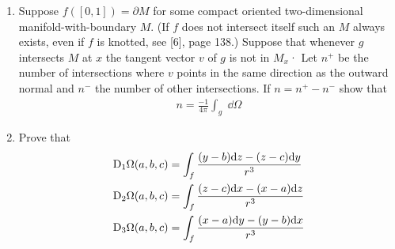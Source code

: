 \begin{problems}
{\begin{enumerate}[label=(\alph*)]
                If $M$ is a compact two-dimensional manifold-with-boundary in $\F{R}^3$ and $(a,b,c)\notin M$ 
                define
                \begin{align*}
                    \Omega(a,b,c)=\int_{M}\;\dd\Theta_{(a,b,c)}.
                \end{align*}

                Let $(a',b',c')$ be a point on the same side of $M$ as the outward normal and $(a',b'c')$
                a point on the oppsite side. Show that by choosing $(a,b,c)$ sufficently close to $(a'.b',c')$ we can 
                make $\Omega(a,b,c)-\Omega(a',b',c')$ as close to $-4\pi$ as desired. \textit{Hint:} First 
                show that if $M=\partial N$ then $\Omega(a,b,c)=-4\pi$ for $(a,b,c)\in N-M$ and $\Omega(a,b,c)=0$
                for $(a,b,c)\notin N$.
            \item Suppose $f([0,1]) = \partial M$ for some compact oriented two-dimensional 
                manifold-with-boundary $M$. (If $f$ does not intersect itself such an $M$ always 
                exists, even if $f$ is knotted, see [6], page 138.) Suppose that whenever $g$ 
                intersects $M$ at $x$ the tangent vector $v$ of $g$ is not in $M_x$·
                Let $n^+$ be the number of intersections where $v$ points in the same direction as 
                the outward normal and $n^-$ the number of other intersections. If $n=n^+ - n^-$ show that
                \begin{align*}
                    n=\frac{-1}{4\pi}\int_{g}\;\dd\Omega
                \end{align*}
            \item Prove that 
                \begin{align*}
                    \mathrm{D}_{1}\Omega(a,b,c) & = \int_{f}\frac{(y-b)\mathrm{d} z-(z-c)\mathrm{d} y}{r^{3}} \\
                    \mathrm{D}_{2}\Omega(a,b,c) & = \int_{f}\frac{(z-c)\mathrm{d} x-(x-a)\mathrm{d} z}{r^{3}} \\
                    \mathrm{D}_{3}\Omega(a,b,c) & = \int_{f}\frac{(x-a)\mathrm{d} y-(y-b)\mathrm{d} x}{r^{3}}
                \end{align*}


\end{enumerate}}
\end{problems}
